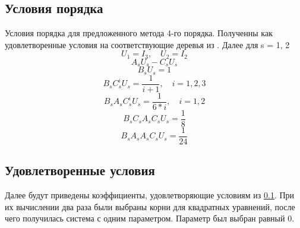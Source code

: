 \documentclass[a4paper,article,14pt]{extarticle}
\begin{document}
\subsection{Условия порядка}\label{order_conditions}
Условия порядка для предложенного метода 4-го порядка. Полученны как удовлетворенные условия на соответствующие деревья из \cite{tree}.
Далее для s = 1, 2
\begin{equation}
U_{1} = I_{3}, \quad U_{2} = I_{2}
\end{equation}
\begin{equation}
A_{s} U_{s} - C_{s} U_{s}
\end{equation}
\begin{equation}
B_{s} U_{s} = 1
\end{equation}
\begin{equation}
B_{s} C_{s}^{i} U_{s} = \frac{1}{i+1}, \quad i = 1, 2, 3
\end{equation}
\begin{equation}
B_{s} A_{s} C_{s}^{i} U_{s} = \frac{1}{6*i}, \quad i = 1, 2
\end{equation}
\begin{equation}
B_{s} C_{s} A_{s} C_{s} U_{s} = \frac{1}{8}
\end{equation}
\begin{equation}
B_{s} A_{s} A_{s} C_{s} U_{s} = \frac{1}{24}
\end{equation}

\subsection{Удовлетворенные условия}\label{conditions}
Далее будут приведены коэффициенты, удовлетворяющие условиям из \ref{order_conditions}. При их вычислении два раза были выбраны корни для квадратных уравнений, после чего получилась система с одним параметром. Параметр был выбран равный 0.
\end{document}
